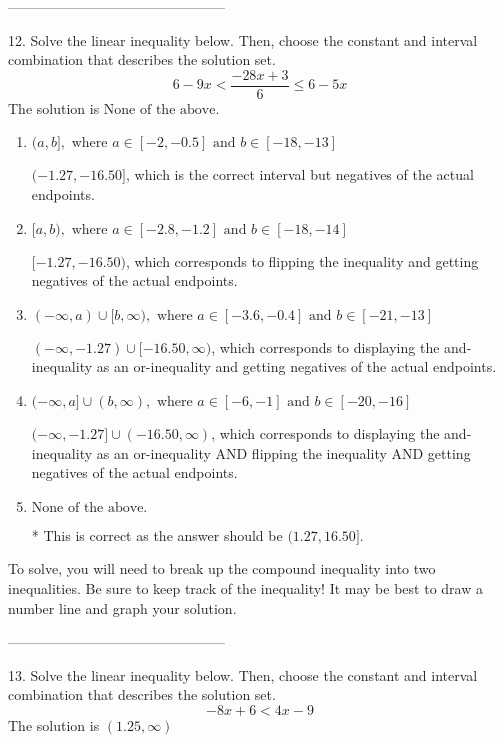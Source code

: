 \documentclass{article}[14pt]
\begin{document}
-----------------------------------------------

12. Solve the linear inequality below. Then, choose the constant and interval combination that describes the solution set.
$$ 6 - 9 x < \frac{-28 x + 3}{6} \leq 6 - 5 x $$ 
The solution is $ \text{None of the above.} $ 

\begin{enumerate}[label=\Alph*.] 
\item $ (a, b], \text{ where } a \in [-2, -0.5] \text{ and } b \in [-18, -13] $ 

 $(-1.27, -16.50]$, which is the correct interval but negatives of the actual endpoints. 
\item $ [a, b), \text{ where } a \in [-2.8, -1.2] \text{ and } b \in [-18, -14] $ 

 $[-1.27, -16.50)$, which corresponds to flipping the inequality and getting negatives of the actual endpoints. 
\item $ (-\infty, a) \cup [b, \infty), \text{ where } a \in [-3.6, -0.4] \text{ and } b \in [-21, -13] $ 

 $(-\infty, -1.27) \cup [-16.50, \infty)$, which corresponds to displaying the and-inequality as an or-inequality and getting negatives of the actual endpoints. 
\item $ (-\infty, a] \cup (b, \infty), \text{ where } a \in [-6, -1] \text{ and } b \in [-20, -16] $ 

 $(-\infty, -1.27] \cup (-16.50, \infty)$, which corresponds to displaying the and-inequality as an or-inequality AND flipping the inequality AND getting negatives of the actual endpoints. 
\item $ \text{None of the above.} $ 

 * This is correct as the answer should be $(1.27, 16.50]$. 
\end{enumerate} 
 
To solve, you will need to break up the compound inequality into two inequalities. Be sure to keep track of the inequality! It may be best to draw a number line and graph your solution.

-----------------------------------------------

13. Solve the linear inequality below. Then, choose the constant and interval combination that describes the solution set.
$$ -8x + 6 < 4x -9 $$ 
The solution is $ (1.25, \infty) $ 
\end{document}
